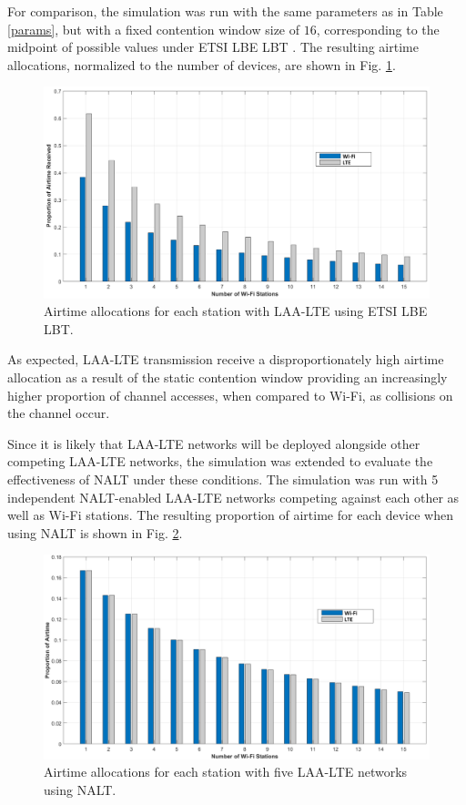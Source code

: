 For comparison, the simulation was run with the same parameters as in Table \ref{params}, but with a fixed contention window size of $16$, corresponding to the midpoint of possible values under ETSI LBE LBT \cite{3gpp}. The resulting airtime allocations, normalized to the number of devices, are shown in Fig. \ref{compresults}.
\begin{figure}[!ht]
	\includegraphics[width=\textwidth]{figures3/ETSIforComp}
	\caption{Airtime allocations for each station with LAA-LTE using ETSI LBE LBT.}
	\label{compresults}
\end{figure}
As expected, LAA-LTE transmission receive a disproportionately high airtime allocation as a result of the static contention window providing an increasingly higher proportion of channel accesses, when compared to Wi-Fi, as collisions on the channel occur.

Since it is likely that LAA-LTE networks will be deployed alongside other competing LAA-LTE networks, the simulation was extended to evaluate the effectiveness of NALT under these conditions.  The simulation was run with 5 independent NALT-enabled LAA-LTE networks competing against each other as well as Wi-Fi stations.  The resulting proportion of airtime for each device when using NALT is shown in Fig. \ref{multi-results}.
\begin{figure}[H]	
	\includegraphics[width=\textwidth]{figures3/NALT-5-15}
	\caption{Airtime allocations for each station with five LAA-LTE networks using NALT.}
	\label{multi-results}
\end{figure}

